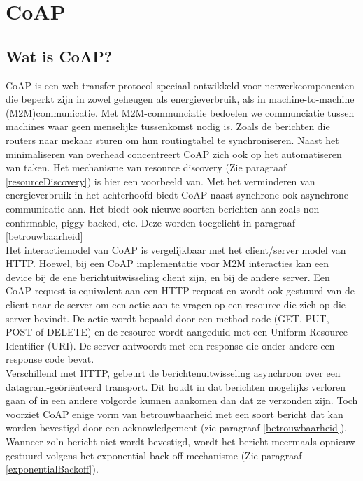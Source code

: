 \chapter{CoAP} \label{CoAP}

\section{Wat is CoAP?}

CoAP is een web transfer protocol speciaal ontwikkeld voor netwerkcomponenten die beperkt zijn in zowel geheugen als energieverbruik, als in machine-to-machine (M2M)communicatie. Met M2M-communciatie bedoelen we communciatie tussen machines waar geen menselijke tussenkomst nodig is. Zoals de berichten die routers naar mekaar sturen om hun routingtabel te synchroniseren. Naast het minimaliseren van overhead concentreert CoAP zich ook op het automatiseren van taken. Het mechanisme van resource discovery (Zie paragraaf \ref{resourceDiscovery}) is hier een voorbeeld van. Met het verminderen van energieverbruik in het achterhoofd biedt CoAP naast synchrone ook asynchrone communicatie aan. Het biedt ook nieuwe soorten berichten aan zoals non-confirmable, piggy-backed, etc. Deze worden toegelicht in paragraaf \ref{betrouwbaarheid}\\


Het interactiemodel van CoAP is vergelijkbaar met het client/server model van HTTP. Hoewel, bij een CoAP implementatie voor M2M interacties kan een device bij de ene berichtuitwisseling client zijn, en bij de andere server. Een CoAP request is equivalent aan een HTTP request en wordt ook gestuurd van de client naar de server om een actie aan te vragen op een resource die zich op die server bevindt. De actie wordt bepaald door een method code (GET, PUT, POST of DELETE) en de resource wordt aangeduid met een Uniform Resource Identifier (URI). De server antwoordt met een response die onder andere een response code bevat.\\

Verschillend met HTTP, gebeurt de berichtenuitwisseling asynchroon over een datagram-ge\"{o}ri\"{e}nteerd transport. Dit houdt in dat berichten mogelijks verloren gaan of in een andere volgorde kunnen aankomen dan dat ze verzonden zijn. Toch voorziet CoAP enige vorm van betrouwbaarheid met een soort bericht dat kan worden bevestigd door een acknowledgement (zie paragraaf \ref{betrouwbaarheid}). Wanneer zo'n bericht niet wordt bevestigd, wordt het bericht meermaals opnieuw gestuurd volgens het exponential back-off mechanisme (Zie paragraaf \ref{exponentialBackoff}).

